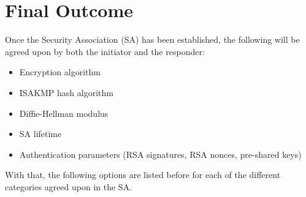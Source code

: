 \documentclass{report}
\begin{document}
\section{Final Outcome}

Once the Security Association (SA) has been established, the following will be agreed upon by both the initiator and the responder:

\begin{itemize}
\item Encryption algorithm
\item ISAKMP hash algorithm
\item Diffie-Hellman modulus
\item SA lifetime
\item Authentication parameters (RSA signatures, RSA nonces, pre-shared keys)
\end{itemize}

With that, the following options are listed before for each of the different categories agreed upon in the SA. 
\end{document}
